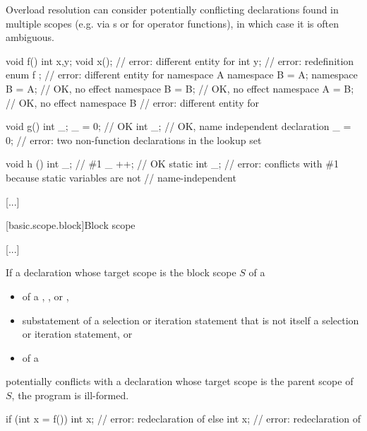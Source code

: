 \documentclass{wg21}
\begin{document}
{\begin{note}
	Overload resolution can consider potentially conflicting declarations
	found in multiple scopes
	(e.g. via s or for operator functions),
	in which case it is often ambiguous.
\end{note}
\begin{example}
\begin{codeblock}
void f() {
	int x,y;
	void x();             // error: different entity for 
	int y;                  // error: redefinition
}
enum { f };             // error: different entity for 
namespace A {}
namespace B = A;
namespace B = A;        // OK, no effect
namespace B = B;        // OK, no effect
namespace A = B;        // OK, no effect
namespace B {}          // error: different entity for 
\end{codeblock}
\begin{addedblock}
\begin{codeblock}
void g() {
    int _;
    _ = 0;    // OK
    int _;    // OK, name independent declaration
    _ = 0;    // error: two non-function declarations in the lookup set
}

void h () {
    int _;          // \#1
    _ ++;           // OK
    static int _;   // error: conflicts with \#1 because static variables are not
                    // name-independent
}
\end{codeblock}
\end{addedblock}
\end{example}

\textcolor{noteclr}{[...]}

[basic.scope.block]{Block scope}

\textcolor{noteclr}{[...]}

\pnum
If a declaration  whose target scope is the block scope $S$ of a
\begin{itemize}
    \item
     of a ,
    , or ,
    \item
    substatement of a selection or iteration statement
    that is not itself a selection or iteration statement, or
    \item
     of a 
\end{itemize}
potentially conflicts with a declaration
whose target scope is the parent scope of $S$,
the program is ill-formed.
\begin{example}
    \begin{codeblock}
        if (int x = f()) {
            int x;            // error: redeclaration of 
        }
        else {
            int x;            // error: redeclaration of 
        }
    \end{codeblock}
\end{example}

}
\end{document}
